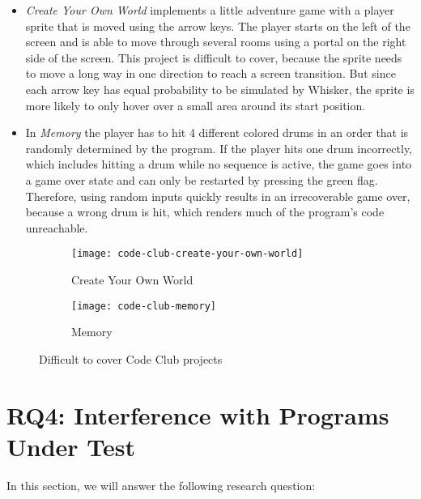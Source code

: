 \begin{itemize}
    \item \textit{Create Your Own World} implements a little adventure game with a player sprite that is moved using the arrow keys.
        The player starts on the left of the screen and is able to move through several rooms using a portal on the right side of the screen.
        This project is difficult to cover, because the sprite needs to move a long way in one direction to reach a screen transition.
        But since each arrow key has equal probability to be simulated by Whisker, the sprite is more likely to only hover over a small area around its start position.
    \item In \textit{Memory} the player has to hit 4 different colored drums in an order that is randomly determined by the program.
        If the player hits one drum incorrectly, which includes hitting a drum while no sequence is active,
        the game goes into a game over state and can only be restarted by pressing the green flag.
        Therefore, using random inputs quickly results in an irrecoverable game over,
        because a wrong drum is hit, which renders much of the program's code unreachable.
\end{itemize}

\begin{figure}[htpb]
    \centering

    \begin{subfigure}{.3\textwidth}
        \centering
        \texttt{[image: code-club-create-your-own-world]}
        \caption{Create Your Own World}
    \end{subfigure}
    \hspace{1mm}
    \begin{subfigure}{.3\textwidth}
        \centering
        \texttt{[image: code-club-memory]}
        \caption{Memory}
    \end{subfigure}%

    \caption{Difficult to cover Code Club projects}
    \label{fig:difficult_code_club_projects}
\end{figure}

\section{RQ4: Interference with Programs Under Test}
\label{sec:rq4}

In this section, we will answer the following research question:

